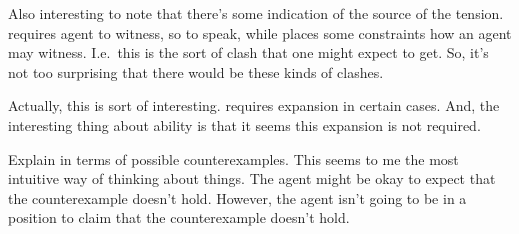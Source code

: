{
  \color{green}
  Also interesting to note that there's some indication of the source of the tension.
  \ESU{} requires agent to witness, so to speak, while \nI{} places some constraints how an agent may witness.
  I.e.\ this is the sort of clash that one might expect to get.
  So, it's not too surprising that there would be these kinds of clashes.

  Actually, this is sort of interesting.
  \nI{} requires expansion in certain cases.
  And, the interesting thing about ability is that it seems this expansion is not required.
}

{
  \color{red}
  Explain \nI{} in terms of possible counterexamples.
  This seems to me the most intuitive way of thinking about things.
  The agent might be okay to expect that the counterexample doesn't hold.
  However, the agent isn't going to be in a position to claim that the counterexample doesn't hold.
}


